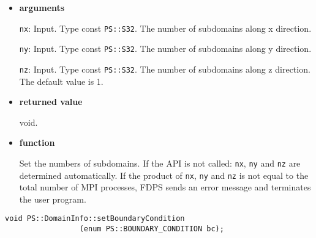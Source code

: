\begin{itemize}

\item {\bf arguments}

{\tt nx}: Input. Type const {\tt PS::S32}. The number of subdomains along x direction.

{\tt ny}: Input. Type const {\tt PS::S32}. The number of subdomains along y direction.

{\tt nz}: Input. Type const {\tt PS::S32}. The number of subdomains along z direction. The default value is 1.



\item {\bf returned value}

void.

\item {\bf function}

Set the numbers of subdomains. If the API is not
called: \texttt{nx}, \texttt{ny} and \texttt{nz} are determined
automatically. If the product of \texttt{nx}, \texttt{ny}
and \texttt{nz} is not equal to the total number of MPI processes,
FDPS sends an error message and terminates the user program.


\end{itemize}


\begin{screen}
\begin{verbatim}
void PS::DomainInfo::setBoundaryCondition
                 (enum PS::BOUNDARY_CONDITION bc);
\end{verbatim}
\end{screen}

